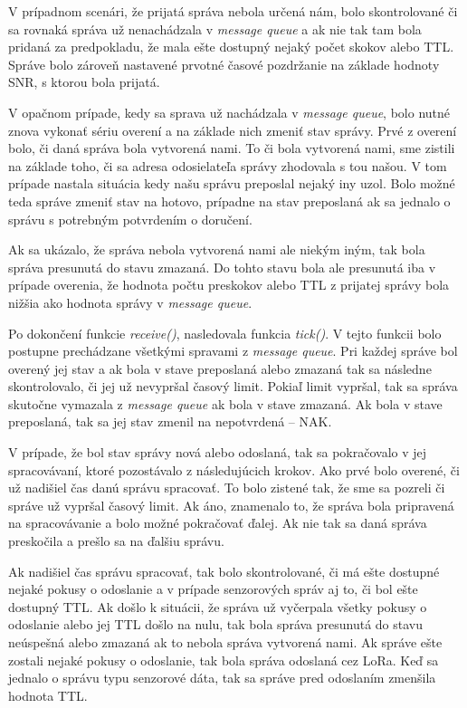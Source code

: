 \documentclass[slovak,master]{diploma}
\begin{document}
V prípadnom scenári, že prijatá správa nebola určená nám, bolo skontrolované či sa rovnaká správa už nenachádzala v \emph{message queue} a ak nie tak tam bola pridaná za predpokladu, že mala ešte dostupný 
nejaký počet skokov alebo TTL. Správe bolo zároveň nastavené prvotné časové pozdržanie na základe hodnoty SNR, s ktorou bola prijatá.

V opačnom prípade, kedy sa sprava už nachádzala v \emph{message queue}, bolo nutné znova vykonať sériu overení a na základe nich zmeniť stav správy.
Prvé z overení bolo, či daná správa bola vytvorená nami. To či bola vytvorená nami, sme zistili na základe toho, či sa adresa odosielateľa správy zhodovala s tou našou. 
V tom prípade nastala situácia kedy našu správu preposlal nejaký iny uzol. Bolo možné teda správe zmeniť stav na hotovo, prípadne na stav preposlaná ak sa jednalo o správu s potrebným 
potvrdením o doručení.

Ak sa ukázalo, že správa nebola vytvorená nami ale niekým iným, tak bola správa presunutá do stavu zmazaná. Do tohto stavu bola ale presunutá iba v prípade overenia, že hodnota počtu preskokov alebo TTL 
z prijatej správy bola nižšia ako hodnota správy v \emph{message queue}. %

Po dokončení funkcie \emph{receive()}, nasledovala funkcia \emph{tick()}. V tejto funkcii bolo postupne prechádzane všetkými spravami z \emph{message queue}. Pri každej správe bol overený jej stav 
a ak bola v stave preposlaná alebo zmazaná tak sa následne skontrolovalo, či jej už nevypršal časový limit. Pokiaľ limit vypršal, tak sa správa 
skutočne vymazala z \emph{message queue} ak bola v stave zmazaná. Ak bola v stave preposlaná, tak sa jej stav zmenil na nepotvrdená -- NAK.

V prípade, že bol stav správy nová alebo odoslaná, tak sa pokračovalo v jej spracovávaní, ktoré pozostávalo z následujúcich krokov.
Ako prvé bolo overené, či už nadišiel čas danú správu spracovať. To bolo zistené tak, že sme sa pozreli či správe už vypršal časový limit. Ak áno, znamenalo to, že správa bola pripravená na spracovávanie 
a bolo možné pokračovať ďalej. Ak nie tak sa daná správa preskočila a prešlo sa na ďalšiu správu.

Ak nadišiel čas správu spracovať, tak bolo skontrolované, či má ešte dostupné nejaké pokusy o odoslanie a v prípade senzorových správ aj to, či bol ešte dostupný TTL.
Ak došlo k situácii, že správa už vyčerpala všetky pokusy o odoslanie alebo jej TTL došlo na nulu, tak bola správa presunutá do stavu neúspešná alebo zmazaná ak to nebola 
správa vytvorená nami. Ak správe ešte zostali nejaké pokusy o odoslanie, tak bola správa odoslaná cez LoRa. Keď sa jednalo o správu typu senzorové dáta, tak sa správe pred 
odoslaním zmenšila hodnota TTL.
\end{document}
